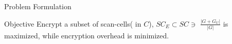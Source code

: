 \begin{frame}{Problem Formulation}
\begin{block}{Objective}
	Encrypt a subset of scan-cells( in $C$), $SC_E \subset SC \ni$  $\frac{|G + G_U|}{|G|}$ is maximized, while encryption overhead is minimized. 
\end{block}

\end{frame}
